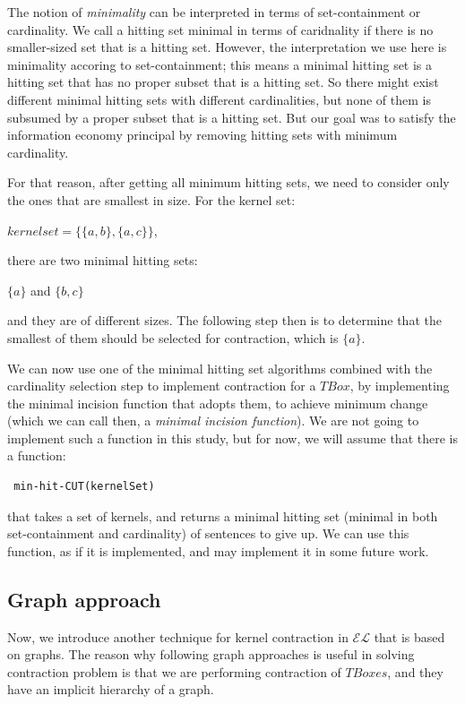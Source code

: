 The notion of \textit{minimality} can be interpreted in terms of set-containment or cardinality. We call a hitting set minimal in terms of caridnality if there is no smaller-sized set that is a hitting set. However, the interpretation we use here is minimality accoring to set-containment; this means a minimal hitting set is a hitting set that has no proper subset that is a hitting set. So there might exist different minimal hitting sets with different cardinalities, but none of them is subsumed by a proper subset that is a hitting set\cite{hit}. But our goal was to satisfy the information economy principal by removing hitting sets with minimum cardinality. 

For that reason, after getting all minimum hitting sets, we need to consider only the ones that are smallest in size. For the kernel set:
\begin{center}
$kernelset = \lbrace \lbrace a, b \rbrace , \lbrace a, c \rbrace \rbrace$,
\end{center}
there are two minimal hitting sets:
\begin{center}
$\lbrace a \rbrace$ \hspace{1cm} and \hspace{1cm} $\lbrace b, c \rbrace$
\end{center}
and they are of different sizes. The following step then is to determine that the smallest of them should be selected for contraction, which is $\lbrace a \rbrace$.

We can now use one of the minimal hitting set algorithms combined with the cardinality selection step to implement contraction for a $TBox$, by implementing the minimal incision function that adopts them, to achieve minimum change (which we can call then, a \textit{minimal incision function}). We are not going to implement such a function in this study, but for now, we will assume that there is a function:
\begin{verbatim}
 min-hit-CUT(kernelSet)
\end{verbatim}
that takes a set of kernels, and returns a minimal hitting set (minimal in both set-containment and cardinality) of sentences to give up. We can use this function, as if it is implemented, and may implement it in some future work.

\subsection{Graph approach}
Now, we introduce another technique for kernel contraction in $\mathcal{EL}$ that is based on graphs. The reason why following graph approaches is useful in solving contraction problem is that we are performing contraction of $TBoxes$, and they have an implicit hierarchy of a graph. 

